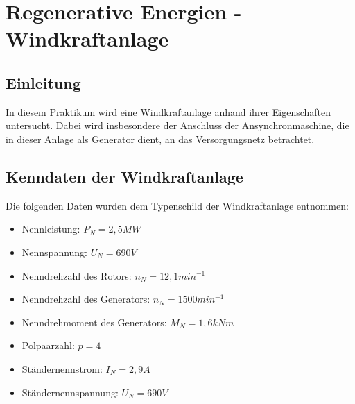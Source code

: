 \documentclass{report}
\begin{document}

\newpage

\tableofcontents

\listoffigures

\newpage

\listoftables

\newpage

\chapter{Regenerative Energien - Windkraftanlage}
\section{Einleitung}


In diesem Praktikum wird eine Windkraftanlage anhand ihrer Eigenschaften untersucht. Dabei wird insbesondere der Anschluss der Ansynchronmaschine, die in dieser Anlage als Generator dient, an das Versorgungsnetz betrachtet.

\section{Kenndaten der Windkraftanlage}

Die folgenden Daten wurden dem Typenschild der Windkraftanlage entnommen:

\begin{itemize}
	\item Nennleistung: $P_{N} = 2,5MW$
	\item Nennspannung: $U_{N} = 690V$
	\item Nenndrehzahl des Rotors: $n_{N} = 12,1min^{-1}$
	\item Nenndrehzahl des Generators: $n_{N} = 1500min^{-1}$
	\item Nenndrehmoment des Generators: $M_{N} = 1,6kNm$
	\item Polpaarzahl: $p = 4$
	\item Ständernennstrom: $I_{N} = 2,9A$
	\item Ständernennspannung: $U_{N} = 690V$
\end{itemize}
\end{document}
